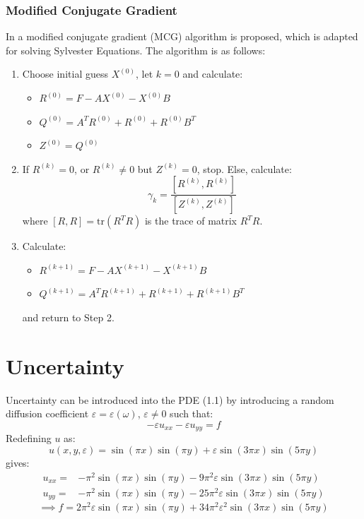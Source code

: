 \documentclass{article}
\numberwithin{equation}{section}
\begin{document}
\subsubsection{Modified Conjugate Gradient}
In \cite{Hou} a modified conjugate gradient (MCG) algorithm is proposed, which is adapted for solving Sylvester Equations. The algorithm is as follows:
\begin{enumerate}
\item Choose initial guess $X^{(0)}$, let $k=0$ and calculate:
	\begin{itemize}
	\item $R^{(0)} = F - AX^{(0)} - X^{(0)}B$
	\item $Q^{(0)} = A^T R^{(0)} + R^{(0)} + R^{(0)} B^T$
	\item $Z^{(0)} = Q^{(0)}$
	\end{itemize}
\item If $R^{(k)} = 0$, or $R^{(k)} \neq 0$ but $Z^{(k)} = 0$, stop. Else, calculate:
\[ \gamma_k = \frac{[R^{(k)}, R^{(k)}]}{[Z^{(k)}, Z^{(k)}]} \]
where $[R,R] = \text{tr}(R^T R)$ is the trace of matrix $R^T R$.
\item Calculate:
	\begin{itemize}
	\item $R^{(k+1)} = F - AX^{(k+1)} - X^{(k+1)} B$
	\item $Q^{(k+1)} = A^T R^{(k+1)} + R^{(k+1)} + R^{(k+1)} B^T$
	\end{itemize}
	and return to Step 2.
\end{enumerate}
\newpage

\section{Uncertainty}
Uncertainty can be introduced into the PDE (1.1) by introducing a random diffusion coefficient $\varepsilon = \varepsilon(\omega)$, $\varepsilon \neq 0$ such that:
\begin{equation}
- \varepsilon u_{xx} - \varepsilon u_{yy} = f
\end{equation}
Redefining $u$ as:
\begin{equation}
u(x,y,\varepsilon) = \sin(\pi x) \sin(\pi y) + \varepsilon \sin(3 \pi x) \sin(5 \pi y)
\end{equation}
gives:
\begin{align}
u_{xx} =& - \pi^2 \sin(\pi x) \sin (\pi y) - 9 \pi^2 \varepsilon \sin(3 \pi x) \sin(5 \pi y) \\
u_{yy} =& - \pi^2 \sin(\pi x) \sin (\pi y) - 25 \pi^2 \varepsilon \sin(3 \pi x) \sin(5 \pi y)
\end{align}
\begin{equation}
\implies f = 2\pi^2 \varepsilon \sin(\pi x) \sin(\pi y)+ 34 \pi^2 \varepsilon^2 \sin(3 \pi x) \sin(5 \pi y)
\end{equation}
\end{document}
